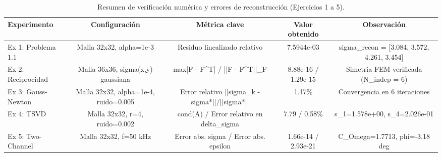 \begin{table}[htbp]
\centering
\caption{Resumen de verificación numérica y errores de reconstrucción (Ejercicios 1 a 5).}
\label{tab:resumen_verificacion}
\begin{tabular}{lcccc}
\hline
Experimento & Configuración & Métrica clave & Valor obtenido & Observación \\
\hline
Ex 1: Problema 1.1 & Malla 32x32, alpha=1e-3 & Residuo linealizado relativo & 7.5944e-03 & sigma\_recon = [3.084, 3.572, 4.261, 3.454] \\
Ex 2: Reciprocidad & Malla 36x36, sigma(x,y) gaussiana & max|F - F^T| / ||F - F^T||\_F & 8.88e-16 / 1.29e-15 & Simetria FEM verificada (N\_indep = 6) \\
Ex 3: Gauss-Newton & Malla 32x32, alpha=1e-4, ruido=0.005 & Error relativo ||sigma\_k - sigma*||/||sigma*|| & 1.17\% & Convergencia en 6 iteraciones \\
Ex 4: TSVD & Malla 32x32, r=4, ruido=0.002 & cond(A) / Error relativo en delta\_sigma & 7.79 / 0.58\% & s\_1=1.578e+00, s\_4=2.026e-01 \\
Ex 5: Two-Channel & Malla 32x32, f=50 kHz & Error abs. sigma / Error abs. epsilon & 1.66e-14 / 2.93e-21 & C\_Omega=1.7713, phi=-3.18 deg \\
\hline
\end{tabular}
\end{table}
